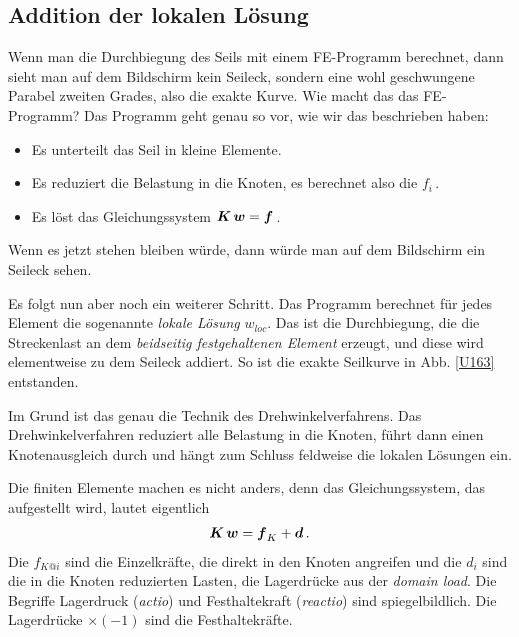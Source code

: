 {\textcolor{sectionTitleBlue}{\section{Addition der lokalen L\"{o}sung}}}
Wenn man die Durchbiegung des Seils mit einem FE-Programm berechnet, dann sieht man auf dem Bildschirm kein Seileck, sondern eine wohl geschwungene Parabel zweiten Grades, also die exakte Kurve. Wie macht das das FE-Programm? Das Programm geht genau so vor, wie wir das beschrieben haben:\\

\begin{itemize}
  \item Es unterteilt das Seil in kleine Elemente.
  \item Es reduziert die Belastung in die Knoten, es berechnet also die $f_i$\,.
  \item Es l\"{o}st das Gleichungssystem $\mbox{\boldmath $K$}\,\mbox{\boldmath $w$} = \mbox{\boldmath $f$}$\,.
\end{itemize}
Wenn es jetzt stehen bleiben w\"{u}rde, dann w\"{u}rde man auf dem Bildschirm ein Seileck sehen.

Es folgt nun aber noch ein weiterer Schritt. Das Programm berechnet f\"{u}r jedes Element die sogenannte {\em lokale L\"{o}sung\/} $w_{loc}$. Das ist die Durchbiegung, die die Streckenlast an dem {\em beidseitig festgehaltenen Element\/} erzeugt, und diese wird elementweise zu dem Seileck addiert. So ist die exakte Seilkurve in Abb. \ref{U163} entstanden.

Im Grund ist das genau die Technik des Drehwinkelverfahrens. Das Drehwinkelverfahren reduziert alle Belastung in die Knoten, f\"{u}hrt dann einen Knotenausgleich durch und h\"{a}ngt zum Schluss feldweise die lokalen L\"{o}sungen ein.

Die finiten Elemente machen es nicht anders, denn das Gleichungssystem, das aufgestellt wird, lautet eigentlich
\begin{align}\label{Eq67}
\mbox{\boldmath $K$}\,\mbox{\boldmath $w$} = \mbox{\boldmath $f$}_K + \mbox{\boldmath $d$}\,.
\end{align}
Die $f_{K @i}$ sind die Einzelkr\"{a}fte, die direkt in den Knoten angreifen und die $d_i$ sind die in die Knoten reduzierten Lasten, die Lagerdr\"{u}cke aus der {\em domain load\/}.  Die Begriffe Lagerdruck ({\em actio\/}) und Festhaltekraft ({\em reactio\/}) sind spiegelbildlich. Die Lagerdr\"{u}cke $\times (-1)$ sind die Festhaltekr\"{a}fte.

